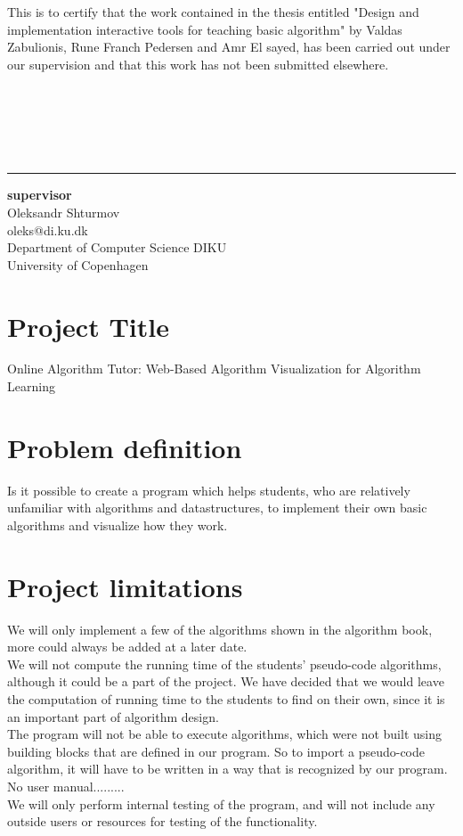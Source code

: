 \documentclass[11pt]{article}
\begin{document}
This is to certify that the work contained in the thesis entitled "Design and implementation interactive tools for teaching basic algorithm" by Valdas Zabulionis, Rune Franch Pedersen and Amr El sayed, has been carried out under our supervision and that this work has not been submitted elsewhere.\\\\\\\\\\\\
\begin{center}\noindent\rule{8cm}{0.4pt}%

\begin{center}
\textbf{supervisor}\\
Oleksandr Shturmov \\
oleks@di.ku.dk \\
Department of Computer Science DIKU \\
University of Copenhagen
\end{center}

\newpage
\tableofcontents
\end{center}
\newpage
\section{Project Title}
Online Algorithm Tutor: Web-Based Algorithm Visualization for Algorithm Learning   
\section{Problem definition}
Is it possible to create a program which helps students, who are relatively unfamiliar with algorithms and datastructures, to implement their own basic algorithms and visualize how they work.

\section{Project limitations}
We will only implement a few of the algorithms shown in the algorithm book, more could always be added at a later date.\\
We will not compute the running time of the students' pseudo-code algorithms, although it could be a part of the project. We have decided that we would leave the computation of running time to the students to find on their own, since it is an important part of algorithm design.\\
The program will not be able to execute algorithms, which were not built using building blocks that are defined in our program. So to import a pseudo-code algorithm, it will have to be written in a way that is recognized by our program.\\
No user manual.........\\
We will only perform internal testing of the program, and will not include any outside users or resources for testing of the functionality. \\
\end{document}
